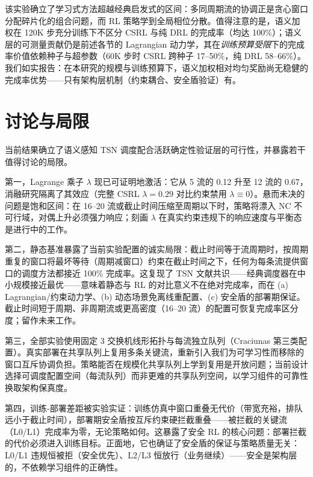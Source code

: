 \documentclass[UTF8]{ctexart}
\begin{document}
该实验确立了学习式方法超越经典启发式的区间：多同周期流的协调正是贪心窗口分配碎片化的组合问题，而 RL 策略学到全局相位分散。值得注意的是，语义加权在 120K 步充分训练下不区分 CSRL 与纯 DRL 的完成率（均达 100\%）；语义层的可测量贡献仍是前述各节的 Lagrangian 动力学，其在\textit{训练预算受限}下的完成率价值依赖种子与超参数（60K 步时 CSRL 跨种子 17--50\%，纯 DRL 58--66\%）。我们如实报告：在本研究的规模与训练预算下，语义加权相对均匀奖励尚无稳健的完成率优势——只有架构层机制（约束耦合、安全盾验证）有。

\section{讨论与局限}

当前结果确立了语义感知 TSN 调度配合活跃确定性验证层的可行性，并暴露若干值得讨论的局限。

第一，Lagrange 乘子 $\lambda$ 现已可证明地激活：它从 5 流的 0.12 升至 12 流的 0.67，消融研究隔离了其效应（完整 CSRL $\lambda=0.29$ 对比约束禁用 $\lambda\equiv0$）。悬而未决的问题是饱和区间：在 16--20 流或截止时间压缩至周期以下时，策略将漂入 NC 不可行域，对偶上升必须强力响应；刻画 $\lambda$ 在真实约束违规下的响应速度与平衡态是进行中的工作。

第二，静态基准暴露了当前实验配置的诚实局限：截止时间等于流周期时，按周期重复的窗口将最坏等待（周期减窗口）约束在截止时间之下，任何为每条流提供窗口的调度方法都接近 100\% 完成率。这复现了 TSN 文献共识——经典调度器在中小规模接近最优——意味着静态与 RL 的对比意义不在绝对完成率，而在 (a) Lagrangian/约束动力学、(b) 动态场景免离线重配置、(c) 安全盾的部署期保证。截止时间短于周期、非周期流或更高密度（16--20 流）的配置可恢复完成率区分度；留作未来工作。

第三，全部实验使用固定 3 交换机线形拓扑与每流独立队列（Craciunas 第三类配置）。真实部署在共享队列上复用多条关键流，重新引入我们为可学习性而移除的窗口互斥协调负担。策略能否在规模化共享队列上学到复用是开放问题；当前设计选择可调度配置空间（每流队列）而非更难的共享队列空间，以学习组件的可靠性换取架构保真度。

第四，训练-部署差距被实验实证：训练仿真中窗口重叠无代价（带宽充裕，排队远小于截止时间），部署期安全盾按互斥约束硬拦截重叠——被拦截的关键流（L0/L1）完成率为零，无论策略如何。这暴露了安全 RL 的核心问题：部署拦截的代价必须进入训练目标。正面地，它也确证了安全盾的保证与策略质量无关：L0/L1 违规恒被拒（安全优先）、L2/L3 恒放行（业务继续）——安全是架构层的，不依赖学习组件的正确性。
\end{document}
